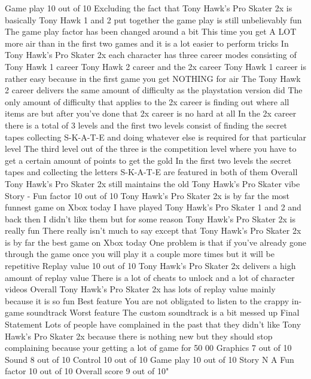 \documentclass{article}
\begin{document}
\begin{itemize}
\begin{itemize}
Game play  10 out of 10 Excluding the fact that Tony Hawk's Pro Skater 2x is basically Tony Hawk 1 and 2 put together  the game play is still unbelievably fun  The game play factor has been changed around a bit  This time  you get A LOT more air than in the first two games  and it is a lot easier to perform tricks  In Tony Hawk's Pro Skater 2x  each character has three career modes  consisting of Tony Hawk 1 career  Tony Hawk 2 career  and the 2x career  Tony Hawk 1 career is rather easy because in the first game  you get NOTHING for air  The Tony Hawk 2 career delivers the same amount of difficulty as the playstation version did  The only amount of difficulty that applies to the 2x career  is finding out where all items are  but after you've done that  2x career is no hard at all  In the 2x career  there is a total of 3 levels  and the first two levels consist of finding the secret tapes  collecting S-K-A-T-E  and doing whatever else is required for that particular level  The third level out of the three  is the competition level  where you have to get a certain amount of points to get the gold  In the first two levels  the secret tapes  and collecting the letters S-K-A-T-E  are featured in both of them  Overall  Tony Hawk's Pro Skater 2x still maintains the old Tony Hawk's Pro Skater vibe  Story  - Fun factor  10 out of 10 Tony Hawk's Pro Skater 2x is by far  the most funnest game on Xbox today  I have played Tony Hawk's Pro Skater 1 and 2  and back then  I didn't like them  but for some reason  Tony Hawk's Pro Skater 2x is really fun  There really isn't much to say  except that Tony Hawk's Pro Skater 2x is by far  the best game on Xbox today  One problem  is that if you've already gone through the game once  you will play it a couple more times  but it will be repetitive  Replay value  10 out of 10 Tony Hawk's Pro Skater 2x delivers a high amount of replay value  There is a lot of cheats to unlock  and a lot of character videos  Overall  Tony Hawk's Pro Skater 2x has lots of replay value  mainly because it is so fun  Best feature  You are not obligated to listen to the crappy in-game soundtrack  Worst feature  The custom soundtrack is a bit messed up  Final Statement  Lots of people have complained in the past that they didn't like Tony Hawk's Pro Skater 2x because there is nothing new  but they should stop complaining because your getting a lot of game for  50 00  Graphics  7 out of 10  Sound  8 out of 10  Control  10 out of 10  Game play  10 out of 10  Story  N A Fun factor  10 out of 10  Overall score  9 out of 10"

\end{itemize}
\end{itemize}
\end{document}
